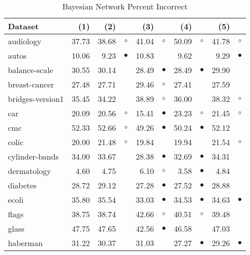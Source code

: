 \begin{table}[thb]
\caption{\label{bnpi}Bayesian Network Percent Incorrect}
\footnotesize
{\centering \begin{tabular}{lrr@{\hspace{0.1cm}}cr@{\hspace{0.1cm}}cr@{\hspace{0.1cm}}cr@{\hspace{0.1cm}}c}
\\
\hline
Dataset & (1)& (2) & & (3) & & (4) & & (5) & \\
\hline
audiology & 37.73 & 38.68 &   $\circ$ & 41.04 &    $\circ$ & 50.09 &    $\circ$ & 41.78 &    $\circ$\\
autos & 10.06 &  9.23 & $\bullet$ & 10.83 &            &  9.62 &            &  9.29 &  $\bullet$\\
balance-scale & 30.55 & 30.14 &           & 28.49 &  $\bullet$ & 28.49 &  $\bullet$ & 29.90 &           \\
breast-cancer & 27.48 & 27.71 &           & 29.46 &    $\circ$ & 27.41 &            & 27.59 &           \\
bridges-version1 & 35.45 & 34.22 &           & 38.89 &    $\circ$ & 36.00 &            & 38.32 &    $\circ$\\
car & 20.09 & 20.56 &   $\circ$ & 15.41 &  $\bullet$ & 23.23 &    $\circ$ & 21.45 &    $\circ$\\
cmc & 52.33 & 52.66 &   $\circ$ & 49.26 &  $\bullet$ & 50.24 &  $\bullet$ & 52.12 &           \\
colic & 20.00 & 21.48 &   $\circ$ & 19.84 &            & 19.94 &            & 21.54 &    $\circ$\\
cylinder-bands & 34.00 & 33.67 &           & 28.38 &  $\bullet$ & 32.69 &  $\bullet$ & 34.31 &           \\
dermatology &  4.60 &  4.75 &           &  6.10 &    $\circ$ &  3.58 &  $\bullet$ &  4.84 &           \\
diabetes & 28.72 & 29.12 &           & 27.28 &  $\bullet$ & 27.52 &  $\bullet$ & 28.88 &           \\
ecoli & 35.80 & 35.54 &           & 33.03 &  $\bullet$ & 34.53 &  $\bullet$ & 34.63 &  $\bullet$\\
flags & 38.75 & 38.74 &           & 42.66 &    $\circ$ & 40.51 &    $\circ$ & 39.48 &           \\
glass & 47.75 & 47.65 &           & 42.56 &  $\bullet$ & 46.58 &            & 47.03 &           \\
haberman & 31.22 & 30.37 &           & 31.03 &            & 27.27 &  $\bullet$ & 29.26 &  $\bullet$\\

\end{tabular}}
\end{table}
